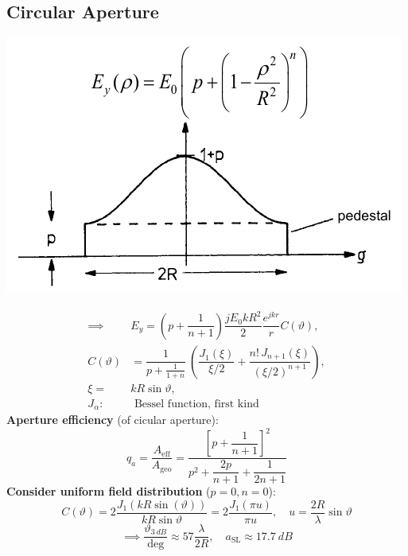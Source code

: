 \subsection{Circular Aperture}
\begin{center}
    \includegraphics[width=.3\paperheight]{content/aawp/pictures/circular_aperture_distribution.png}
\end{center}
\begin{align*}
    \implies &E_y = \left(p + \dfrac{1}{n+1}\right) \dfrac{jE_0 k R^2}{2} \dfrac{e^{jkr}}{r}C(\vartheta),\\
    C(\vartheta) &= \dfrac{1}{p + \frac{1}{1+n}}\
    \left(\dfrac{J_1(\xi)}{\xi/2} + \dfrac{n!\,J_{n+1}(\xi)}{(\xi/2)^{n+1}}\right),\\
    \xi = &kR\sin\vartheta,\\
    J_\alpha:&\text{ Bessel function, first kind}
\end{align*}
\textbf{Aperture efficiency} (of cicular aperture):
\begin{equation*}
    q_a = \dfrac{A_{\mathrm{eff}}}{A_{\mathrm{geo}}} = \dfrac{\left[p + \dfrac{1}{n+1}\right]^2}{p^2 + \dfrac{2p}{n+1} + \dfrac{1}{2n+1}}
\end{equation*}
\textbf{Consider uniform field distribution} (\(p=0, n=0\)):
\begin{equation*}
    C(\vartheta) = 2\dfrac{J_1(kR\sin(\vartheta))}{kR\sin\vartheta} = 2\dfrac{J_1(\pi u)}{\pi u}, \quad u = \dfrac{2R}{\lambda}\sin\vartheta
\end{equation*}
\begin{equation*}
    \implies \dfrac{\vartheta_{\SI{3}{dB}}}{\mathrm{deg}} \approx 57\dfrac{\lambda}{2R}, \quad a_{\mathrm{SL}} \approx \SI{17.7}{dB}
\end{equation*}


